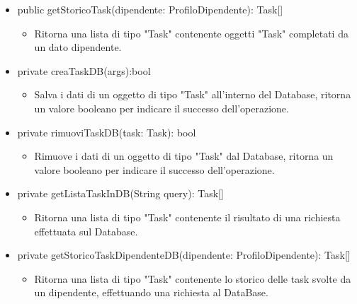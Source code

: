 \documentclass{report}
\begin{document}
\begin{itemize}
\item public getStoricoTask(dipendente: ProfiloDipendente): Task[]
\begin{itemize}
    \item Ritorna una lista di tipo "Task" contenente oggetti "Task" completati da un dato dipendente.
\end{itemize}
\item private creaTaskDB(args):bool
\begin{itemize}
    \item Salva i dati di un oggetto di tipo "Task" all'interno del Database, ritorna un valore booleano per indicare il successo dell'operazione.
\end{itemize}
\item private rimuoviTaskDB(task: Task): bool
\begin{itemize}
    \item Rimuove i dati di un oggetto di tipo "Task" dal Database, ritorna un valore booleano per indicare il successo dell'operazione.
\end{itemize}
\item private getListaTaskInDB(String query): Task[]
\begin{itemize}
    \item Ritorna una lista di tipo "Task" contenente il risultato  di una richiesta effettuata sul Database.
\end{itemize}
\item private getStoricoTaskDipendenteDB(dipendente: ProfiloDipendente): Task[]
\begin{itemize}
    \item Ritorna una lista di tipo "Task" contenente lo storico delle task svolte da un dipendente, effettuando una richiesta al DataBase.
\end{itemize}
\end{itemize}
\end{document}
